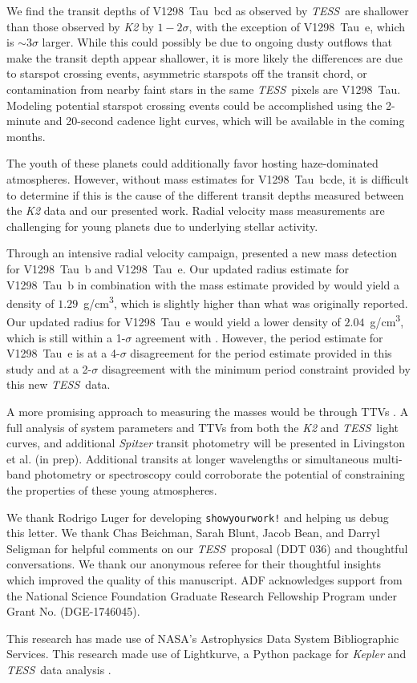 \documentclass[twocolumn]{aastex631}
\newcommand{\tess}{\textit{TESS}}
\newcommand{\sname}{V1298~Tau\xspace}
\newcommand{\allplanets}{V1298~Tau~bcde\xspace}
\newcommand{\planetb}{V1298~Tau~b\xspace}
\newcommand{\planete}{V1298~Tau~e\xspace}
\newcommand{\planetknown}{V1298~Tau~bcd\xspace}
\begin{document}
We find the transit depths of \planetknown as observed by \tess\ are shallower than those observed by \textit{K2} by $1-2\sigma$, with the exception of \planete, which is $\sim 3\sigma$ larger. While this could possibly be due to ongoing dusty outflows that make the transit depth appear shallower, it is more likely the differences are due to starspot crossing events, asymmetric starspots off the transit chord, or contamination from nearby faint stars in the same \tess\ pixels are \sname. Modeling potential starspot crossing events could be accomplished using the 2-minute and 20-second cadence light curves, which will be available in the coming months.

The youth of these planets could additionally favor hosting haze-dominated atmospheres. However, without mass estimates for \allplanets, it is difficult to determine if this is the cause of the different transit depths measured between the \textit{K2} data and our presented work. Radial velocity mass measurements are challenging for young planets due to underlying stellar activity.

Through an intensive radial velocity campaign, \cite{suarez21} presented a new mass detection for \planetb and \planete. Our updated radius estimate for \planetb in combination with the mass estimate provided by \cite{suarez21} would yield a density of $1.29$~g/cm\textsuperscript{3}, which is slightly higher than what was originally reported. Our updated radius for \planete would yield a lower density of $2.04$~g/cm\textsuperscript{3}, which is still within a 1-$\sigma$ agreement with \cite{suarez21}. However, the period estimate for \planete is at a 4-$\sigma$ disagreement for the period estimate provided in this study and at a 2-$\sigma$ disagreement with the minimum period constraint provided by this new \tess\ data.

A more promising approach to measuring the masses would be through TTVs \citep{agol18}. A full analysis of system parameters and TTVs from both the \textit{K2} and \tess\ light curves, and additional \textit{Spitzer} transit photometry will be presented in Livingston et al. (in prep). Additional transits at longer wavelengths or simultaneous multi-band photometry or spectroscopy could corroborate the potential of constraining the properties of these young atmospheres.


\begin{acknowledgments}
We thank Rodrigo Luger for developing \texttt{showyourwork!} \citep{luger21} and helping us debug this letter. We thank Chas Beichman, Sarah Blunt, Jacob Bean, and Darryl Seligman for helpful comments on our \tess\ proposal (DDT 036) and thoughtful conversations. We thank our anonymous referee for their thoughtful insights which improved the quality of this manuscript. ADF acknowledges support from the National Science Foundation Graduate Research Fellowship Program under Grant No. (DGE-1746045).

This research has made use of NASA's Astrophysics Data System Bibliographic Services. This research made use of Lightkurve, a Python package for \textit{Kepler} and \tess\ data analysis \citep{lightkurve}.

\end{acknowledgments}
\end{document}
